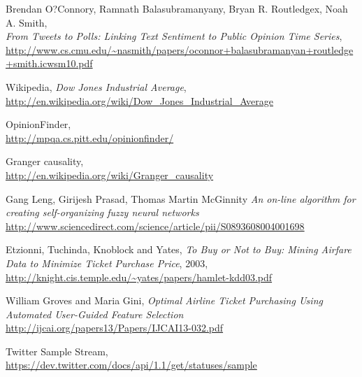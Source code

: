 \documentclass[minf,frontabs,twoside,singlespacing,parskip]{infthesis}
\begin{document}
\begin{thebibliography}{10}
	Brendan O?Connory,  Ramnath Balasubramanyany, Bryan R. Routledgex, Noah A. Smith, \\  
	\emph{From Tweets to Polls: Linking Text Sentiment to Public Opinion Time Series}, \\
	{\url{http://www.cs.cmu.edu/~nasmith/papers/oconnor+balasubramanyan+routledge+smith.icwsm10.pdf}}

	Wikipedia, \emph{Dow Jones Industrial Average}, \\
	{\url{http://en.wikipedia.org/wiki/Dow_Jones_Industrial_Average}}

	OpinionFinder, \\
	{\url{http://mpqa.cs.pitt.edu/opinionfinder/}}
	
	Granger causality, \\
	{\url{http://en.wikipedia.org/wiki/Granger_causality}}

	Gang Leng, Girijesh Prasad, Thomas Martin McGinnity
	\emph{An on-line algorithm for creating self-organizing fuzzy neural networks}
	{\url{http://www.sciencedirect.com/science/article/pii/S0893608004001698}}
  
 	Etzionni, Tuchinda, Knoblock and Yates, \emph{To Buy or Not to Buy: Mining Airfare Data to Minimize Ticket Purchase Price}, 2003, \\
  	{\url{http://knight.cis.temple.edu/~yates/papers/hamlet-kdd03.pdf}}
	
	William Groves and Maria Gini, \emph{Optimal Airline Ticket Purchasing Using Automated User-Guided Feature Selection} \\
	{\url{http://ijcai.org/papers13/Papers/IJCAI13-032.pdf}}

	Twitter Sample Stream, \\
	{\url{https://dev.twitter.com/docs/api/1.1/get/statuses/sample}}

\end{thebibliography}
\end{document}
